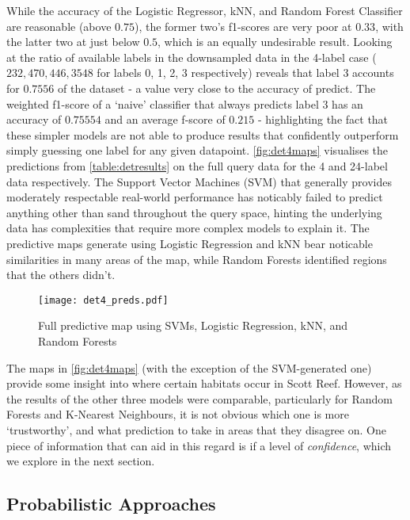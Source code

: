 While the accuracy of the Logistic Regressor, kNN, and Random Forest Classifier are reasonable (above $0.75$), the former two's f1-scores are very poor at $0.33$, with the latter two at just below $0.5$, which is an equally undesirable result. Looking at the ratio of available labels in the downsampled data in the 4-label case ($232,  470,  446, 3548$ for labels 0, 1, 2, 3 respectively) reveals that label 3 accounts for $0.7556$ of the dataset - a value very close to the accuracy of predict. The weighted f1-score of a `naive' classifier that always predicts label 3 has an accuracy of  $0.75554$ and an average f-score of $0.215$ - highlighting the fact that these simpler models are not able to produce results that confidently outperform simply guessing one label for any given datapoint. \autoref{fig:det4maps} visualises the predictions from \autoref{table:detresults} on the full query data for the 4 and 24-label data respectively. The Support Vector Machines (SVM) that generally provides moderately respectable real-world performance has noticably failed to predict anything other than sand throughout the query space, hinting the underlying data has complexities that require more complex models to explain it. The predictive maps generate using Logistic Regression and kNN bear noticable similarities in many areas of the map, while Random Forests identified regions that the others didn't. 

\begin{figure}[H]
    \texttt{[image: det4\_preds.pdf]}
    \caption{Full predictive map using SVMs, Logistic Regression, kNN, and Random Forests}
    \label{fig:det4maps}
\end{figure}

The maps in \autoref{fig:det4maps} (with the exception of the SVM-generated one) provide some insight into where certain habitats occur in Scott Reef. However, as the results of the other three models were comparable, particularly for Random Forests and K-Nearest Neighbours, it is not obvious which one is more `trustworthy', and what prediction to take in areas that they disagree on. One piece of information that can aid in this regard is if a level of \textit{confidence}, which we explore in the next section.

\subsection{Probabilistic Approaches}

